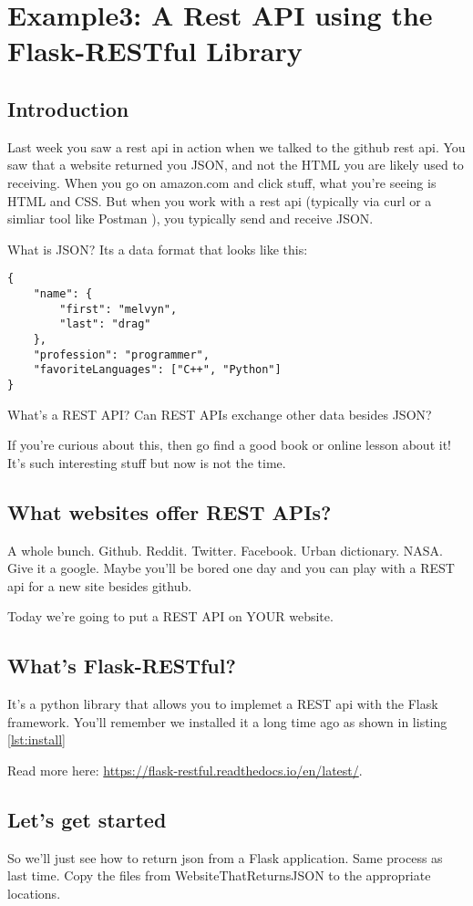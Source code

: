 \documentclass[10pt]{article}
\begin{document}
\section{Example3: A Rest API using the Flask-RESTful Library}
\subsection{Introduction}
Last week you saw a rest api in action when we talked to the github rest api.
You saw that a website returned you JSON, and not the HTML you are likely used
to receiving. When you go on amazon.com and click stuff, what you're seeing is
HTML and CSS. But when you work with a rest api (typically via curl or a simliar
tool like Postman ), you typically send and receive JSON.

What is JSON? Its a data format that looks like this:

\begin{verbatim}
{
	"name": {
		"first": "melvyn",
		"last": "drag"
	},
	"profession": "programmer",
	"favoriteLanguages": ["C++", "Python"]
}
\end{verbatim}

What's a REST API? Can REST APIs exchange other data besides JSON? 

If you're curious about this, then go find a good book or online lesson about
it! It's such interesting stuff but now is not the time.

\subsection{What websites offer REST APIs?}
A whole bunch. Github. Reddit. Twitter. Facebook. Urban dictionary. NASA. Give
it a google. Maybe you'll be bored one day and you can play with a REST api for
a new site besides github.

Today we're going to put a REST API on YOUR website.

\subsection{What's Flask-RESTful?}
It's a python library that allows you to implemet a REST api with the Flask
framework. You'll remember we installed it a long time ago as shown in listing
\ref{lst:install}

Read more here: \url{https://flask-restful.readthedocs.io/en/latest/}.

\subsection{Let's get started}
So we'll just see how to return json from a Flask application.
Same process as last time. Copy the files from WebsiteThatReturnsJSON to the appropriate
locations.
\end{document}
